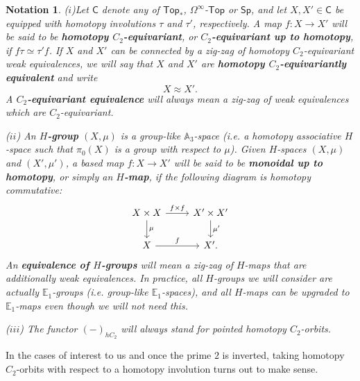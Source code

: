 \documentclass[a4paper, oneside]{amsart}
\newcommand{\1}{\mathds{1}}
\newtheorem{notn}[thm]{Notation}
\theoremstyle{remark}
\theoremstyle{definition}
\numberwithin{equation}{section}
\begin{document}
\begin{notn}\label{equivariantnotn}
    ($i$)\hspace{1.5pt}Let $\mathsf{C}$ denote any of $\mathsf{Top}_*$, $\Omega^\infty$-$\mathsf{Top}$ or $\mathsf{Sp}$, and let $X, X'\in \mathsf{C}$ be equipped with homotopy involutions $\tau$ and $\tau'$, respectively. A map $f:X\to X'$ will be said to be \textbf{homotopy $C_2$-equivariant}, or \textbf{$C_2$-equivariant up to homotopy}, if $f\tau\simeq \tau'f$. If $X$ and $X'$ can be connected by a zig-zag of homotopy $C_2$-equivariant weak equivalences, we will say that $X$ and $X'$ are \textbf{homotopy $C_2$-equivariantly equivalent} and write 
    $$X\approx X'.$$
    A \textbf{$C_2$-equivariant equivalence} will always mean a zig-zag of weak equivalences which are $C_2$-equivariant.

    \noindent ($ii$)\hspace{1.5pt} An \textbf{$H$-group} $(X,\mu)$ is a group-like $\mathbb{A}_3$-space (i.e. a homotopy associative $H$-space such that $\pi_0(X)$ is a group with respect to $\mu$). Given $H$-spaces $(X,\mu)$ and $(X',\mu')$, a based map $f: X\to X'$ will be said to be \textbf{monoidal up to homotopy}, or simply an \textbf{$H$-map}, if the following diagram is homotopy commutative:
    $$
\begin{tikzcd}
    X\times X\rar["f\times f"]\dar["\mu"] &X'\times X'\dar["\mu'"]\\
    X\rar["f"]&X'. 
\end{tikzcd}
    $$
    An \textbf{equivalence of $H$-groups} will mean a zig-zag of $H$-maps that are additionally weak equivalences. In practice, all $H$-groups we will consider are actually $\mathbb{E}_1$-groups (i.e. group-like $\mathbb{E}_1$-spaces), and all $H$-maps can be upgraded to $\mathbb{E}_1$-maps even though we will not need this. 

    \noindent($iii$)\hspace{1.5pt} The functor $(-)_{hC_2}$ will always stand for pointed homotopy $C_2$-orbits.
\end{notn}

In the cases of interest to us and once the prime $2$ is inverted, taking homotopy $C_2$-orbits with respect to a homotopy involution turns out to make sense.
\end{document}
